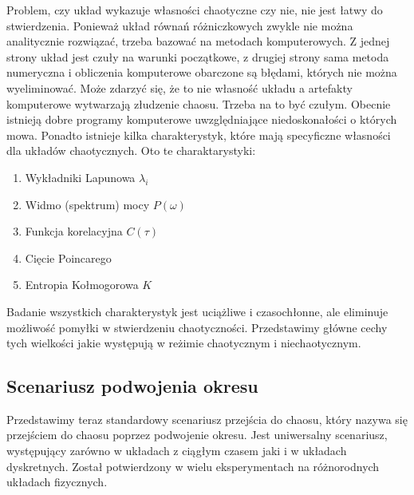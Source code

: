 \documentclass[a4paper,12pt,polish]{sphinxmanual}
\begin{document}
Problem, czy układ wykazuje własności chaotyczne czy nie, nie jest łatwy do stwierdzenia. Ponieważ układ równań różniczkowych zwykle nie można analitycznie rozwiązać, trzeba bazować na metodach komputerowych. Z jednej strony układ jest czuły na warunki początkowe, z drugiej strony sama metoda numeryczna i obliczenia komputerowe obarczone są błędami, których nie można wyeliminować. Może zdarzyć się, że to nie własność  układu a artefakty komputerowe wytwarzają złudzenie  chaosu. Trzeba na to być czułym. Obecnie istnieją dobre programy komputerowe uwzględniające niedoskonałości o których mowa. Ponadto istnieje kilka charakterystyk,  które mają specyficzne własności  dla układów chaotycznych.  Oto te charaktarystyki:
\begin{enumerate}
\item {} 
Wykładniki Lapunowa $\lambda_i$

\item {} 
Widmo (spektrum) mocy $P(\omega)$

\item {} 
Funkcja korelacyjna  $C(\tau)$

\item {} 
Cięcie Poincarego

\item {} 
Entropia Kołmogorowa $K$

\end{enumerate}

Badanie wszystkich  charakterystyk jest uciążliwe i czasochłonne, ale eliminuje możliwość pomyłki w stwierdzeniu  chaotyczności. Przedstawimy główne cechy  tych wielkości jakie występują w reżimie chaotycznym i niechaotycznym.


\subsection{Scenariusz podwojenia okresu}
\label{ch2/chII012:scenariusz-podwojenia-okresu}
Przedstawimy teraz standardowy scenariusz przejścia do chaosu, który nazywa się przejściem do chaosu poprzez podwojenie okresu. Jest uniwersalny scenariusz, występujący zarówno w układach z ciągłym czasem jaki i w układach dyskretnych. Został potwierdzony w wielu eksperymentach na różnorodnych układach fizycznych.
\end{document}
